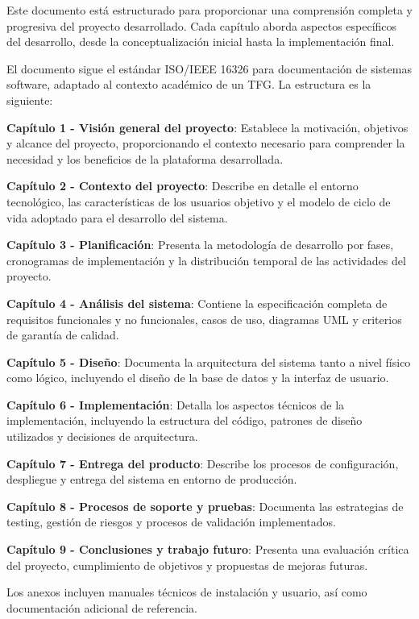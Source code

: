 \documentclass[12pt,a4paper,oneside]{report}
\begin{document}
Este documento está estructurado para proporcionar una comprensión completa y progresiva del proyecto desarrollado. Cada capítulo aborda aspectos específicos del desarrollo, desde la conceptualización inicial hasta la implementación final.

El documento sigue el estándar ISO/IEEE 16326 para documentación de sistemas software, adaptado al contexto académico de un TFG. La estructura es la siguiente:

\textbf{Capítulo 1 - Visión general del proyecto}: Establece la
motivación, objetivos y alcance del proyecto, proporcionando el contexto
necesario para comprender la necesidad y los beneficios de la plataforma
desarrollada.

\textbf{Capítulo 2 - Contexto del proyecto}: Describe en detalle el
entorno tecnológico, las características de los usuarios objetivo y el
modelo de ciclo de vida adoptado para el desarrollo del sistema.

\textbf{Capítulo 3 - Planificación}: Presenta la metodología de
desarrollo por fases, cronogramas de implementación y la distribución
temporal de las actividades del proyecto.

\textbf{Capítulo 4 - Análisis del sistema}: Contiene la especificación
completa de requisitos funcionales y no funcionales, casos de uso,
diagramas UML y criterios de garantía de calidad.

\textbf{Capítulo 5 - Diseño}: Documenta la arquitectura del sistema
tanto a nivel físico como lógico, incluyendo el diseño de la base de
datos y la interfaz de usuario.

\textbf{Capítulo 6 - Implementación}: Detalla los aspectos técnicos de
la implementación, incluyendo la estructura del código, patrones de
diseño utilizados y decisiones de arquitectura.

\textbf{Capítulo 7 - Entrega del producto}: Describe los procesos de
configuración, despliegue y entrega del sistema en entorno de
producción.

\textbf{Capítulo 8 - Procesos de soporte y pruebas}: Documenta las
estrategias de testing, gestión de riesgos y procesos de validación
implementados.

\textbf{Capítulo 9 - Conclusiones y trabajo futuro}: Presenta una
evaluación crítica del proyecto, cumplimiento de objetivos y propuestas
de mejoras futuras.

Los anexos incluyen manuales técnicos de instalación y usuario, así como
documentación adicional de referencia.
\end{document}
